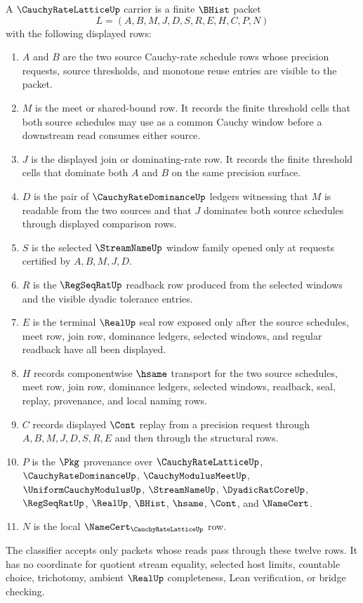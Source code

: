 \begin{definition}
\label{def:cauchy-rate-lattice-carrier}
A $\CauchyRateLatticeUp$ carrier is a finite $\BHist$ packet
$$
L=(A,B,M,J,D,S,R,E,H,C,P,N)
$$
with the following displayed rows:
\begin{enumerate}
\item $A$ and $B$ are the two source Cauchy-rate schedule rows whose precision requests, source thresholds, and monotone reuse entries are visible to the packet.
\item $M$ is the meet or shared-bound row. It records the finite threshold cells that both source schedules may use as a common Cauchy window before a downstream read consumes either source.
\item $J$ is the displayed join or dominating-rate row. It records the finite threshold cells that dominate both $A$ and $B$ on the same precision surface.
\item $D$ is the pair of $\CauchyRateDominanceUp$ ledgers witnessing that $M$ is readable from the two sources and that $J$ dominates both source schedules through displayed comparison rows.
\item $S$ is the selected $\StreamNameUp$ window family opened only at requests certified by $A,B,M,J,D$.
\item $R$ is the $\RegSeqRatUp$ readback row produced from the selected windows and the visible dyadic tolerance entries.
\item $E$ is the terminal $\RealUp$ seal row exposed only after the source schedules, meet row, join row, dominance ledgers, selected windows, and regular readback have all been displayed.
\item $H$ records componentwise $\hsame$ transport for the two source schedules, meet row, join row, dominance ledgers, selected windows, readback, seal, replay, provenance, and local naming rows.
\item $C$ records displayed $\Cont$ replay from a precision request through $A,B,M,J,D,S,R,E$ and then through the structural rows.
\item $P$ is the $\Pkg$ provenance over $\CauchyRateLatticeUp$, $\CauchyRateDominanceUp$, $\CauchyModulusMeetUp$, $\UniformCauchyModulusUp$, $\StreamNameUp$, $\DyadicRatCoreUp$, $\RegSeqRatUp$, $\RealUp$, $\BHist$, $\hsame$, $\Cont$, and $\NameCert$.
\item $N$ is the local $\NameCert_{\CauchyRateLatticeUp}$ row.
\end{enumerate}
The classifier accepts only packets whose reads pass through these twelve rows. It has no coordinate for quotient stream equality, selected host limits, countable choice, trichotomy, ambient $\RealUp$ completeness, Lean verification, or bridge checking.
\end{definition}

